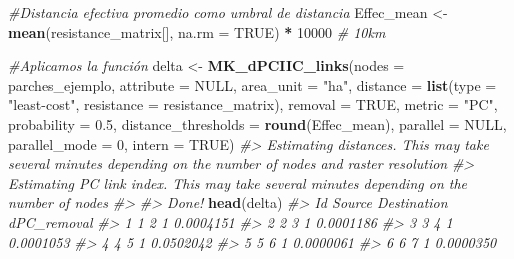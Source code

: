 \documentclass[
]{book}
\newenvironment{Shaded}{\begin{snugshade}}{\end{snugshade}}
\newcommand{\AttributeTok}[1]{\textcolor[rgb]{0.13,0.29,0.53}{#1}}
\newcommand{\CommentTok}[1]{\textcolor[rgb]{0.56,0.35,0.01}{\textit{#1}}}
\newcommand{\ConstantTok}[1]{\textcolor[rgb]{0.56,0.35,0.01}{#1}}
\newcommand{\DecValTok}[1]{\textcolor[rgb]{0.00,0.00,0.81}{#1}}
\newcommand{\FloatTok}[1]{\textcolor[rgb]{0.00,0.00,0.81}{#1}}
\newcommand{\FunctionTok}[1]{\textcolor[rgb]{0.13,0.29,0.53}{\textbf{#1}}}
\newcommand{\NormalTok}[1]{#1}
\newcommand{\OtherTok}[1]{\textcolor[rgb]{0.56,0.35,0.01}{#1}}
\newcommand{\SpecialCharTok}[1]{\textcolor[rgb]{0.81,0.36,0.00}{\textbf{#1}}}
\newcommand{\StringTok}[1]{\textcolor[rgb]{0.31,0.60,0.02}{#1}}
\begin{document}
\begin{Shaded}
\begin{Highlighting}[]
\CommentTok{\#Distancia efectiva promedio como umbral de distancia}
\NormalTok{Effec\_mean }\OtherTok{\textless{}{-}} \FunctionTok{mean}\NormalTok{(resistance\_matrix[], }\AttributeTok{na.rm =} \ConstantTok{TRUE}\NormalTok{) }\SpecialCharTok{*} \DecValTok{10000} \CommentTok{\# 10km}

\CommentTok{\#Aplicamos la función}
\NormalTok{delta }\OtherTok{\textless{}{-}} \FunctionTok{MK\_dPCIIC\_links}\NormalTok{(}\AttributeTok{nodes =}\NormalTok{ parches\_ejemplo,}
                         \AttributeTok{attribute =} \ConstantTok{NULL}\NormalTok{,}
                         \AttributeTok{area\_unit =} \StringTok{"ha"}\NormalTok{,}
                         \AttributeTok{distance =} \FunctionTok{list}\NormalTok{(}\AttributeTok{type =} \StringTok{"least{-}cost"}\NormalTok{, }
                                         \AttributeTok{resistance =}\NormalTok{ resistance\_matrix),}
                         \AttributeTok{removal =} \ConstantTok{TRUE}\NormalTok{,}
                         \AttributeTok{metric =} \StringTok{"PC"}\NormalTok{,}
                         \AttributeTok{probability =} \FloatTok{0.5}\NormalTok{,}
                         \AttributeTok{distance\_thresholds =} \FunctionTok{round}\NormalTok{(Effec\_mean),}
                         \AttributeTok{parallel =} \ConstantTok{NULL}\NormalTok{,}
                         \AttributeTok{parallel\_mode =} \DecValTok{0}\NormalTok{,}
                         \AttributeTok{intern =} \ConstantTok{TRUE}\NormalTok{)}
\CommentTok{\#\textgreater{} Estimating distances. This may take several minutes depending on the number of nodes and raster resolution}
\CommentTok{\#\textgreater{} Estimating PC link index. This may take several minutes depending on the number of nodes}
\CommentTok{\#\textgreater{} }
\CommentTok{\#\textgreater{} Done!}
\FunctionTok{head}\NormalTok{(delta)}
\CommentTok{\#\textgreater{}   Id Source Destination dPC\_removal}
\CommentTok{\#\textgreater{} 1  1      2           1   0.0004151}
\CommentTok{\#\textgreater{} 2  2      3           1   0.0001186}
\CommentTok{\#\textgreater{} 3  3      4           1   0.0001053}
\CommentTok{\#\textgreater{} 4  4      5           1   0.0502042}
\CommentTok{\#\textgreater{} 5  5      6           1   0.0000061}
\CommentTok{\#\textgreater{} 6  6      7           1   0.0000350}
\end{Highlighting}
\end{Shaded}
\end{document}
